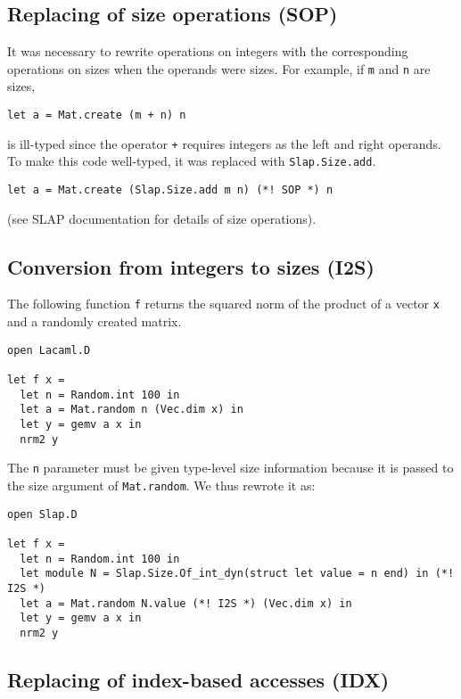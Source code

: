 \documentclass[10pt,a4paper]{article}
\begin{document}
\subsection{Replacing of size operations (SOP)}
\label{sec:SOP}

It was necessary to rewrite operations on integers with the
corresponding operations on sizes when the operands were sizes.
For example, if \lstinline|m| and \lstinline|n| are sizes,
\begin{lstlisting}
let a = Mat.create (m + n) n
\end{lstlisting}
is ill-typed since the operator \lstinline|+| requires integers
as the left and right operands. To make this code well-typed,
it was replaced with \lstinline|Slap.Size.add|.
\begin{lstlisting}
let a = Mat.create (Slap.Size.add m n) (*! SOP *) n
\end{lstlisting}
(see SLAP documentation for details of size operations).

\subsection{Conversion from integers to sizes (I2S)}
\label{sec:I2S}

The following function \lstinline|f| returns the squared norm of the product of a vector
\lstinline|x| and a randomly created matrix.
\begin{lstlisting}
open Lacaml.D

let f x =
  let n = Random.int 100 in
  let a = Mat.random n (Vec.dim x) in
  let y = gemv a x in
  nrm2 y
\end{lstlisting}
The \lstinline|n| parameter must be given type-level size information because
it is passed to the size argument of \lstinline|Mat.random|.
We thus rewrote it as:
\begin{lstlisting}
open Slap.D

let f x =
  let n = Random.int 100 in
  let module N = Slap.Size.Of_int_dyn(struct let value = n end) in (*! I2S *)
  let a = Mat.random N.value (*! I2S *) (Vec.dim x) in
  let y = gemv a x in
  nrm2 y
\end{lstlisting}

\subsection{Replacing of index-based accesses (IDX)}
\label{sec:IDX}
\end{document}
